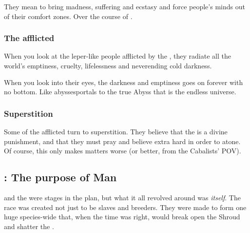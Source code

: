 They mean to bring madness, suffering and ecstasy and force people's minds out of their comfort zones. 
Over the course of \booktitle{\SentinelsofMith}. 







\subsubsection{The afflicted}
When you look at the leper-like people afflicted by the \Morbus, they radiate all the world's emptiness, cruelty, lifelessness and neverending cold darkness. 

When you look into their eyes, the darkness and emptiness goes on forever with no bottom. Like abysses\dash portals to the true Abyss that is the endless universe. 





\subsubsection{Superstition}
Some of the afflicted turn to superstition. 
They believe that the \Morbus{} is a divine punishment, and that they must pray and believe extra hard in order to atone. 
Of course, this only makes matters worse (or better, from the Cabalists' POV). 








\subsection{\Lithrim: The purpose of Man}
\index{\CrystalSphere}%
\index{\Lithrim}%
\Iquin{} and the \Morbus{} were stages in the plan, but what it all revolved around was \emph{\humanity{} itself}. 
The \human{} race was created not just to be slaves and breeders. 
They were made to form one huge species-wide \matrix{} that, when the time was right, would break open the Shroud and shatter the \CrystalSphere. 

